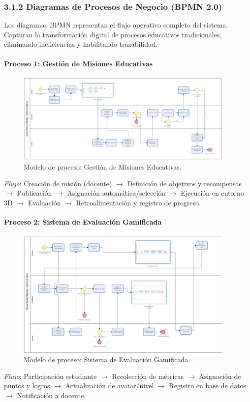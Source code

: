 \subsubsection{3.1.2 Diagramas de Procesos de Negocio (BPMN 2.0)}
Los diagramas BPMN representan el flujo operativo completo del sistema. Capturan la transformación digital de procesos educativos tradicionales, eliminando ineficiencias y habilitando trazabilidad.

\paragraph{Proceso 1: Gestión de Misiones Educativas}
\begin{figure}[H]
	\centering
	\includegraphics[width=0.95\textwidth]{images/bizgi_gestion_de_misiones.png}
	\caption{Modelo de proceso: Gestión de Misiones Educativas.}
	\label{fig:proc-misiones}
\end{figure}
\textit{Flujo}: Creación de misión (docente) $\rightarrow$ Definición de objetivos y recompensas $\rightarrow$ Publicación $\rightarrow$ Asignación automática/selección $\rightarrow$ Ejecución en entorno 3D $\rightarrow$ Evaluación $\rightarrow$ Retroalimentación y registro de progreso.

\paragraph{Proceso 2: Sistema de Evaluación Gamificada}
\begin{figure}[H]
	\centering
	\includegraphics[width=0.95\textwidth]{images/bizagi_gestion_de_clases.png}
	\caption{Modelo de proceso: Sistema de Evaluación Gamificada.}
	\label{fig:proc-evaluacion}
\end{figure}
\textit{Flujo}: Participación estudiante $\rightarrow$ Recolección de métricas $\rightarrow$ Asignación de puntos y logros $\rightarrow$ Actualización de avatar/nivel $\rightarrow$ Registro en base de datos $\rightarrow$ Notificación a docente.

